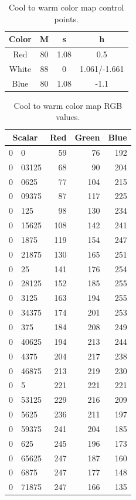 \documentclass[review,journal]{vgtc}         %
\newcommand{\RGB}{RGB\xspace}
\begin{document}
\begin{table}
  \centering
  \caption{Cool to warm color map control points.}
  \begin{tabular}{c@{\qquad}ccc}
    Color & M & s & h \\
    \hline
    Red & 80 & 1.08 & 0.5 \\
    White & 88 & 0 & 1.061/-1.661 \\
    Blue & 80 & 1.08 & -1.1
  \end{tabular}
  \label{table:Cool2Warm}
\end{table}

\begin{table}
  \centering
  \caption{Cool to warm color map \RGB values.}
  \begin{tabular}{r@{.}l@{\qquad}rrr}
    \multicolumn{2}{c}{Scalar\qquad\qquad}
    		&	Red	&	Green	&	Blue	\\
    \hline
    0&0		&	59	&	76	&	192	\\
    0&03125	&	68	&	90	&	204	\\
    0&0625	&	77	&	104	&	215	\\
    0&09375	&	87	&	117	&	225	\\
    0&125	&	98	&	130	&	234	\\
    0&15625	&	108	&	142	&	241	\\
    0&1875	&	119	&	154	&	247	\\
    0&21875	&	130	&	165	&	251	\\
    0&25	&	141	&	176	&	254	\\
    0&28125	&	152	&	185	&	255	\\
    0&3125	&	163	&	194	&	255	\\
    0&34375	&	174	&	201	&	253	\\
    0&375	&	184	&	208	&	249	\\
    0&40625	&	194	&	213	&	244	\\
    0&4375	&	204	&	217	&	238	\\
    0&46875	&	213	&	219	&	230	\\
    0&5		&	221	&	221	&	221	\\
    0&53125	&	229	&	216	&	209	\\
    0&5625	&	236	&	211	&	197	\\
    0&59375	&	241	&	204	&	185	\\
    0&625	&	245	&	196	&	173	\\
    0&65625	&	247	&	187	&	160	\\
    0&6875	&	247	&	177	&	148	\\
    0&71875	&	247	&	166	&	135	\\

\end{tabular}
\end{table}
\end{document}
